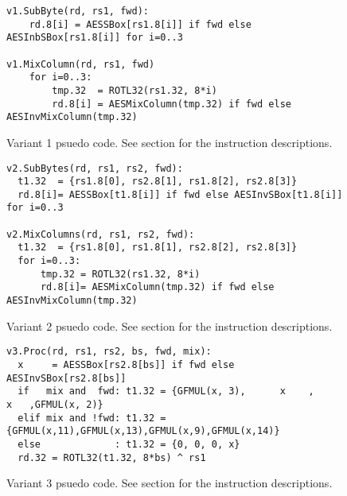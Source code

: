 
%

\begin{figure}[!htb]
\begin{lstlisting}[language=pseudo,style=block]
v1.SubByte(rd, rs1, fwd):
    rd.8[i] = AESSBox[rs1.8[i]] if fwd else AESInbSBox[rs1.8[i]] for i=0..3

v1.MixColumn(rd, rs1, fwd)
    for i=0..3:
        tmp.32  = ROTL32(rs1.32, 8*i)
        rd.8[i] = AESMixColumn(tmp.32) if fwd else AESInvMixColumn(tmp.32)
\end{lstlisting}
\caption{
    Variant 1 psuedo code.
    See section  for the instruction
    descriptions.
}
\label{fig:pseudo:v1}
\end{figure}

%

\begin{figure}[!htb]
\begin{lstlisting}[language=pseudo,style=block]
v2.SubBytes(rd, rs1, rs2, fwd):
  t1.32  = {rs1.8[0], rs2.8[1], rs1.8[2], rs2.8[3]}
  rd.8[i]= AESSBox[t1.8[i]] if fwd else AESInvSBox[t1.8[i]] for i=0..3

v2.MixColumns(rd, rs1, rs2, fwd):
  t1.32  = {rs1.8[0], rs1.8[1], rs2.8[2], rs2.8[3]}
  for i=0..3:
      tmp.32 = ROTL32(rs1.32, 8*i)
      rd.8[i]= AESMixColumn(tmp.32) if fwd else AESInvMixColumn(tmp.32)
\end{lstlisting}
\caption{
    Variant 2 psuedo code.
    See section  for the instruction
    descriptions.
}
\label{fig:pseudo:v2}
\end{figure}

%

\begin{figure}[!htb]
\begin{lstlisting}[language=pseudo,style=block]
v3.Proc(rd, rs1, rs2, bs, fwd, mix):
  x     = AESSBox[rs2.8[bs]] if fwd else AESInvSBox[rs2.8[bs]]
  if   mix and  fwd: t1.32 = {GFMUL(x, 3),      x    ,      x   ,GFMUL(x, 2)}
  elif mix and !fwd: t1.32 = {GFMUL(x,11),GFMUL(x,13),GFMUL(x,9),GFMUL(x,14)}
  else             : t1.32 = {0, 0, 0, x}
  rd.32 = ROTL32(t1.32, 8*bs) ^ rs1
\end{lstlisting}
\caption{
    Variant 3 psuedo code.
    See section  for the instruction
    descriptions.
}
\label{fig:pseudo:v3}
\end{figure}

